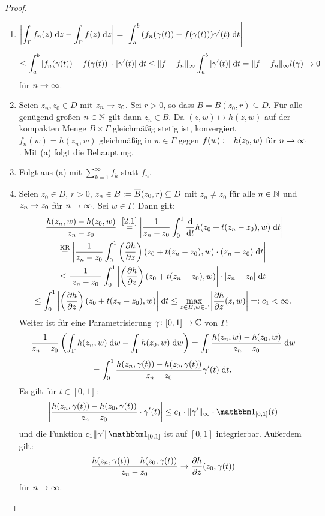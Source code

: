 \documentclass[a4paper,twoside,DIV15,BCOR12mm]{scrbook}
\begin{document}
\begin{proof}\begin{enumerate}
\item $\displaystyle\left\lvert\int_{\Gamma}^{}{f_n(z)}\;\mathrm{d} z-\int_{\Gamma}^{}{f(z)}\;\mathrm{d} z\right\lvert = \left\lvert\int_{a}^{b}{(f_n(\gamma(t))-f(\gamma(t)))\gamma^\prime(t)}\;\mathrm{d} t\right\lvert$
\[\leq\int_{a}^{b}{|f_n(\gamma(t))-f(\gamma(t))|\cdot|\gamma^\prime(t)|}\;\mathrm{d} t\leq\|f-f_n\|_\infty\int_{a}^{b}{|\gamma^\prime(t)|}\;\mathrm{d} t = \|f-f_n\|_\infty l(\gamma)\rightarrow 0\]
für $n\rightarrow\infty$.

\item Seien $z_n,z_0\in D$ mit $z_n\rightarrow z_0$. Sei $r>0$, so dass $B=\bar{B}(z_0,r)\subseteq D$. Für alle genügend großen $n\in\mathbb{N}$ gilt dann $z_n\in B$. Da $(z,w)\mapsto h(z,w)$ auf der kompakten Menge $B\times\Gamma$ gleichmäßig stetig ist, konvergiert $f_n(w) = h(z_n,w)$ gleichmäßig in $w\in\Gamma$ gegen $f(w):= h(z_0,w)$ für $n\rightarrow\infty$. Mit (a) folgt die Behauptung.

\item Folgt aus (a) mit $\displaystyle\sum_{k=1}^\infty f_k$ statt $f_n$.

\item Seien $z_0\in D$, $r>0$, $z_n\in B:= \overline{B}(z_0,r)\subseteq D$ mit $z_n\neq z_0$ für alle $n\in\mathbb{N}$ und $z_n\rightarrow z_0$ für $n\rightarrow\infty$. Sei $w\in\Gamma$. Dann gilt:
\begin{multline*}
\left\lvert\frac{h(z_n,w)-h(z_0,w)}{z_n-z_0}\right\lvert \overset{\eqref{2.1}}{=}\left\lvert\frac{1}{z_n-z_0}\int_{0}^{1}{\frac{\mathrm{d}}{\mathrm{d} t}h(z_0+t(z_n-z_0),w)}\;\mathrm{d} t\right\lvert\\
\overset{\text{KR}}{=}\left\lvert\frac{1}{z_n-z_0}\int_{0}^{1}{\left(\frac{\partial h}{\partial z}\right)(z_0+t(z_n-z_0),w)\cdot(z_n-z_0)}\;\mathrm{d} t\right\lvert\\ 
\leq \frac{1}{\left\lvert z_n-z_0\right\lvert}\int_{0}^{1}{\left\lvert\left(\frac{\partial h}{\partial z}\right)(z_0+t(z_n-z_0),w)\right\lvert\cdot\left\lvert z_n-z_0\right\lvert}\;\mathrm{d} t\\
\leq\int_{0}^{1}{\left\lvert\left(\frac{\partial h}{\partial z}\right)(z_0+t(z_n-z_0),w)\right\lvert}\;\mathrm{d} t \leq \max_{z\in B,w\in\Gamma} \left\lvert\frac{\partial h}{\partial z}(z,w)\right\lvert =: c_1 < \infty.
\end{multline*}
Weiter ist für eine Parametrisierung $\gamma\colon[0,1]\rightarrow\mathbb{C}$ von $\Gamma$:
\[\frac{1}{z_n-z_0}\left(\int_{\Gamma}^{}{h(z_n,w)}\;\mathrm{d} w-\int_{\Gamma}^{}{h(z_0,w)}\;\mathrm{d} w\right) = \int_{\Gamma}^{}{\frac{h(z_n,w)-h(z_0,w)}{z_n-z_0}}\;\mathrm{d} w\]
\[=\int_{0}^{1}{\frac{h(z_n,\gamma(t))-h(z_0,\gamma(t))}{z_n-z_0}\gamma^\prime(t)}\;\mathrm{d} t.\]
Es gilt für $t\in[0,1]$:
\[\abs{\frac{h(z_n,\gamma(t))-h(z_0,\gamma(t))}{z_n-z_0}\cdot\gamma^\prime(t)} \leq c_1\cdot\|\gamma^\prime\|_\infty\cdot\charfnkt{[0,1]}(t)\]
und die Funktion $c_1\|\gamma^\prime\|\charfnkt{[0,1]}$ ist auf $[0,1]$ integrierbar. Außerdem gilt:
\[\frac{h(z_n,\gamma(t))-h(z_0,\gamma(t))}{z_n-z_0}\rightarrow\frac{\partial h}{\partial z}(z_0,\gamma(t))\]
für $n\rightarrow\infty$.


\end{enumerate}
\end{proof}
\end{document}
